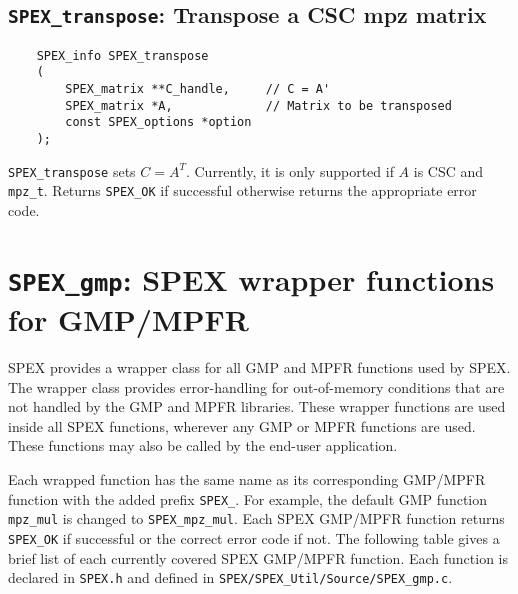 \documentclass[12pt,oneside]{book}
\theoremstyle{definition}
\begin{document}


\subsection{\texttt{SPEX\_transpose}: Transpose a CSC mpz matrix}
\begin{mdframed}[userdefinedwidth=\textwidth]
{\footnotesize
\begin{verbatim}
    SPEX_info SPEX_transpose
    (
        SPEX_matrix **C_handle,     // C = A'
        SPEX_matrix *A,             // Matrix to be transposed
        const SPEX_options *option
    ); 
\end{verbatim}
} \end{mdframed}

\verb|SPEX_transpose| sets $C = A^T$. Currently, it is only supported if $A$ is CSC and \verb|mpz_t|. Returns \verb|SPEX_OK| if successful otherwise returns the appropriate error code.


\newpage
\section{\texttt{SPEX\_gmp}: SPEX wrapper functions for GMP/MPFR}
SPEX provides a wrapper class for all GMP and MPFR functions used by SPEX.
The wrapper class provides error-handling for out-of-memory conditions
that are not handled by the GMP and MPFR libraries.  These wrapper functions
are used inside all SPEX functions, wherever any GMP or MPFR functions are
used.  These functions may also be called by the end-user application. 

Each wrapped function has the same name as its corresponding GMP/MPFR function
with the added prefix \verb|SPEX_|. For example, the default GMP function
\verb|mpz_mul| is changed to \verb|SPEX_mpz_mul|. Each SPEX GMP/MPFR function
returns \verb|SPEX_OK| if successful or the correct error code if not. The
following table gives a brief list of each currently covered SPEX GMP/MPFR
function. Each function is declared in \verb|SPEX.h| and defined in
\verb|SPEX/SPEX_Util/Source/SPEX_gmp.c|.
\end{document}
